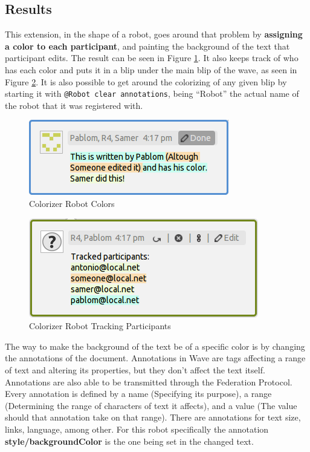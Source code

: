 \subsection{Results}
This extension, in the shape of a robot, goes around that problem by \textbf{assigning a color to each participant}, and painting the background of the text that participant edits. The result can be seen in Figure \ref{fig:colorizer_editions}. It also keeps track of who has each color and puts it in a blip under the main blip of the wave, as seen in Figure \ref{fig:colorizer_editors}. It is also possible to get around the colorizing of any given blip by starting it with \verb|@Robot clear annotations|, being ``Robot'' the actual name of the robot that it was registered with.\\[.2cm]
\begin{figure}[H]
  \center
    \includegraphics[keepaspectratio, scale=0.8]{Media/Captures/Extensions/Colorizer/ColorizerEditions.png}
  \caption{Colorizer Robot Colors}
  \label{fig:colorizer_editions}
\end{figure}
\begin{figure}[h]
  \center
    \includegraphics[keepaspectratio, scale=0.7]{Media/Captures/Extensions/Colorizer/ColorizerEditors.png}
  \caption{Colorizer Robot Tracking Participants}
  \label{fig:colorizer_editors}
\end{figure}
The way to make the background of the text be of a specific color is by changing the annotations of the document. Annotations in Wave are tags affecting a range of text and altering its properties, but they don't affect the text itself. Annotations are also able to be transmitted through the Federation Protocol. Every annotation is defined by a name (Specifying its purpose), a range (Determining the range of characters of text it affects), and a value (The value should that annotation take on that range). There are annotations for text size, links, language, among other. For this robot specifically the annotation \textbf{style/backgroundColor} is the one being set in the changed text.\\[.2cm]
